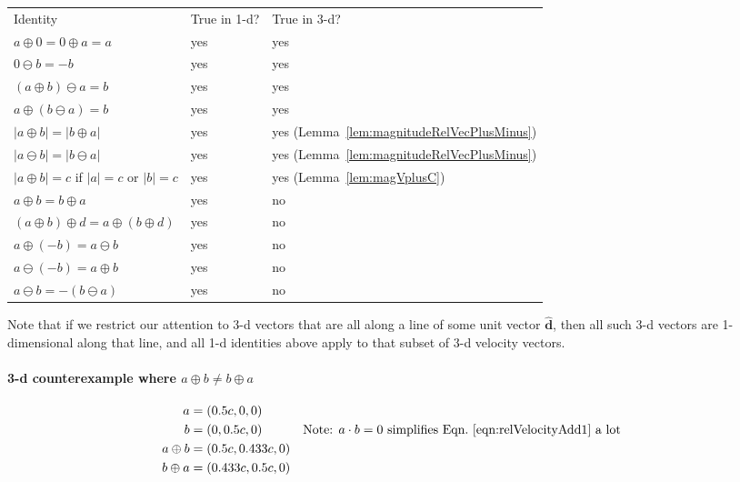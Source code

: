 \documentclass[a4paper]{article}
\theoremstyle{plain}
\theoremstyle{definition}
\newcommand{\hatvec}[1]{\hat{\mathbf{#1}}}
\begin{document}
\begin{center}
\begin{tabularx}{1.0\textwidth}{|p{4cm}|p{2cm}|p{3cm}|}
\cline{1-3} \\
Identity & True in 1-d? & True in 3-d?
\\ \cline{1-3}
$a \oplus 0 = 0 \oplus a = a$ & yes & yes
\\ \cline{1-3}
$0 \ominus b = -b$ & yes & yes
\\ \cline{1-3}
$(a \oplus b) \ominus a = b$ & yes & yes
\\ \cline{1-3}
$a \oplus (b \ominus a) = b$ & yes & yes
\\ \cline{1-3}
$|a \oplus b|=|b \oplus a|$ & yes & yes (Lemma~\ref{lem:magnitudeRelVecPlusMinus})
\\ \cline{1-3}
$|a \ominus b|=|b \ominus a|$ & yes & yes (Lemma~\ref{lem:magnitudeRelVecPlusMinus})
\\ \cline{1-3}
$|a \oplus b| = c$ if $|a|=c$ or $|b|=c$ & yes & yes (Lemma~\ref{lem:magVplusC})
\\ \cline{1-3}
$a \oplus b = b \oplus a$ & yes & no
\\ \cline{1-3}
$(a \oplus b) \oplus d = a \oplus (b \oplus d)$ & yes & no
\\ \cline{1-3}
$a \oplus (-b) = a \ominus b$ & yes & no
\\ \cline{1-3}
$a \ominus (-b) = a \oplus b$ & yes & no
\\ \cline{1-3}
$a \ominus b = - (b \ominus a)$ & yes & no
\\ \cline{1-3}
\end{tabularx}
\end{center}

Note that if we restrict our attention to 3-d vectors that are all
along a line of some unit vector $\hatvec{d}$, then all such 3-d
vectors are 1-dimensional along that line, and all 1-d identities
above apply to that subset of 3-d velocity vectors.

\paragraph{3-d counterexample where $a \oplus b \neq b \oplus a$}
\begin{align*}
  a & = (0.5c, 0, 0) \\
  b & = (0, 0.5c, 0) & & \text{Note: $a \cdot b = 0$ simplifies Eqn.~\eqref{eqn:relVelocityAdd1} a lot} \\
  a \oplus b & = (0.5c, 0.433c, 0) \\
  b \oplus a & = (0.433c, 0.5c, 0)
\end{align*}
\end{document}
